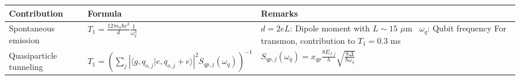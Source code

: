 \documentclass[]{article}
\begin{document}
\begin{table}[h]
\hspace*{-2cm}
\centering
\begin{tabular}{|p{2cm}|p{5.7cm}|p{7.5cm}|}
	\hline 
Contribution	& Formula & Remarks \\ 
\hline \hline 
Spontaneous emission & $T_1 = \frac{12 \pi \epsilon_0 \hbar c^3}{d} \frac{1}{\omega_q^3}$~\cite{koch2007} & $d=2eL$: Dipole moment with $L\sim 15$ $\mu$m~\cite{koch2007} \newline $\omega_q$: Qubit frequency \newline
For transmon, contribution to $T_1=0.3$ ms~\cite{koch2007} \\
\hline
Quasiparticle tunneling & $T_1 = \left( \sum_j \left| \langle g, q_{o, j} | e, q_{o, j} + e \rangle \right|^{2} S_{qp, j} (\omega_q) \right) ^{-1} $ \newline \cite{catelani2011, modification_sin}& 
$S_{qp, j} (\omega_q) = x_{qp}\frac{8 E_{J, j}}{h}\sqrt{\frac{8 \Delta}{\hbar \omega_q}}$~\cite{yan2016} \newline 

\end{tabular}
\end{table}
\end{document}
